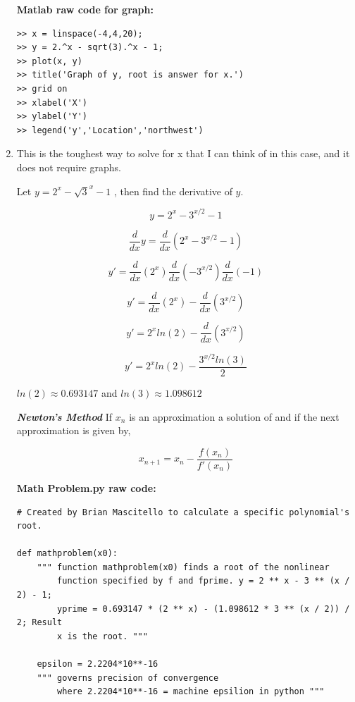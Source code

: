 \documentclass[12pt]{article}
\begin{document}
\begin{enumerate}[label=\textbf{\arabic*}.]
\begin{minipage}{.3\linewidth}
\begin{tabular}{c | c}
\end{tabular}

\end{minipage}

\textbf{Matlab raw code for graph:}
\begin{verbatim}
>> x = linspace(-4,4,20);
>> y = 2.^x - sqrt(3).^x - 1;
>> plot(x, y)
>> title('Graph of y, root is answer for x.')
>> grid on
>> xlabel('X')
>> ylabel('Y')
>> legend('y','Location','northwest')
\end{verbatim}


\newpage

\item This is the toughest way to solve for x that I can think of in this case, and it does not require graphs.

Let $y = 2^{x} - \sqrt{3}^x - 1$ , then find the derivative of $y$.

$$y = 2^{x} - 3^{x/2} - 1$$

$$\dfrac{d}{dx}y = \dfrac{d}{dx}(2^{x} - 3^{x/2} - 1)$$

$$y' = \dfrac{d}{dx}(2^{x}) \dfrac{d}{dx}(- 3^{x/2}) \dfrac{d}{dx}(- 1)$$

$$y' = \dfrac{d}{dx}(2^{x}) - \dfrac{d}{dx}(3^{x/2})$$

$$y' = 2^{x}ln(2) - \dfrac{d}{dx}(3^{x/2})$$

$$\boxed{y' = 2^{x}ln(2) - \dfrac{3^{x/2}ln(3)}{2}}$$

$ln(2) \approx 0.693147$ and $ln(3) \approx 1.098612$

\textbf{\textit{Newton's Method}}
\hspace{3 mm} If $x_n$ is an approximation a solution of  and if  the next approximation is given by,

$$x_{n+1} = x_n - \dfrac{f(x_n)}{f'(x_n)}$$

\newpage

\textbf{Math Problem.py raw code:}
\begin{verbatim}
# Created by Brian Mascitello to calculate a specific polynomial's root.

def mathproblem(x0):
    """ function mathproblem(x0) finds a root of the nonlinear
        function specified by f and fprime. y = 2 ** x - 3 ** (x / 2) - 1;
        yprime = 0.693147 * (2 ** x) - (1.098612 * 3 ** (x / 2)) / 2; Result
        x is the root. """

    epsilon = 2.2204*10**-16
    """ governs precision of convergence
        where 2.2204*10**-16 = machine epsilion in python """
    

\end{verbatim}
\end{enumerate}
\end{document}
